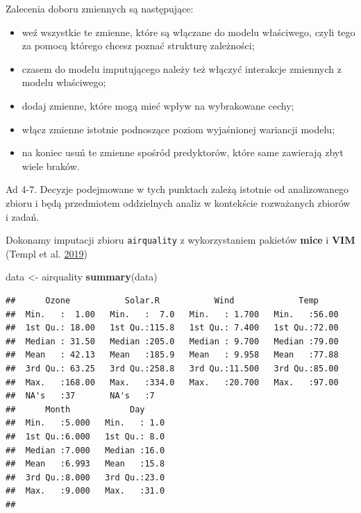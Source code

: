 \documentclass[
]{book}
\newenvironment{Shaded}{\begin{snugshade}}{\end{snugshade}}
\newcommand{\KeywordTok}[1]{\textcolor[rgb]{0.13,0.29,0.53}{\textbf{#1}}}
\newcommand{\NormalTok}[1]{#1}
\newcommand{\StringTok}[1]{\textcolor[rgb]{0.31,0.60,0.02}{#1}}
\providecommand{\tightlist}{%
  \setlength{\itemsep}{0pt}\setlength{\parskip}{0pt}}
\theoremstyle{plain}
\theoremstyle{definition}
\theoremstyle{definition}
\theoremstyle{definition}
\theoremstyle{definition}
\theoremstyle{remark}
\let\BeginKnitrBlock\begin \let\EndKnitrBlock\end
\begin{document}
Zalecenia doboru zmiennych są następujące:

\begin{itemize}
\tightlist
\item
  weź wszystkie te zmienne, które są włączane do modelu właściwego, czyli tego za pomocą którego chcesz poznać strukturę zależności;
\item
  czasem do modelu imputującego należy też włączyć interakcje zmiennych z modelu właściwego;
\item
  dodaj zmienne, które mogą mieć wpływ na wybrakowane cechy;
\item
  włącz zmienne istotnie podnoszące poziom wyjaśnionej wariancji modelu;
\item
  na koniec usuń te zmienne spośród predyktorów, które same zawierają zbyt wiele braków.
\end{itemize}

Ad 4-7. Decyzje podejmowane w tych punktach zależą istotnie od analizowanego zbioru i będą przedmiotem oddzielnych analiz w kontekście rozważanych zbiorów i zadań.

\BeginKnitrBlock{example}
\protect\hypertarget{exm:przyk21}{}{\label{exm:przyk21} }Dokonamy imputacji zbioru \texttt{airquality} z wykorzystaniem pakietów \textbf{mice} i \textbf{VIM} (Templ et al. \protect\hyperlink{ref-R-VIM}{2019})
\EndKnitrBlock{example}

\begin{Shaded}
\begin{Highlighting}[]
\NormalTok{data <-}\StringTok{ }\NormalTok{airquality}
\KeywordTok{summary}\NormalTok{(data)}
\end{Highlighting}
\end{Shaded}

\begin{verbatim}
##      Ozone           Solar.R           Wind             Temp      
##  Min.   :  1.00   Min.   :  7.0   Min.   : 1.700   Min.   :56.00  
##  1st Qu.: 18.00   1st Qu.:115.8   1st Qu.: 7.400   1st Qu.:72.00  
##  Median : 31.50   Median :205.0   Median : 9.700   Median :79.00  
##  Mean   : 42.13   Mean   :185.9   Mean   : 9.958   Mean   :77.88  
##  3rd Qu.: 63.25   3rd Qu.:258.8   3rd Qu.:11.500   3rd Qu.:85.00  
##  Max.   :168.00   Max.   :334.0   Max.   :20.700   Max.   :97.00  
##  NA's   :37       NA's   :7                                       
##      Month            Day      
##  Min.   :5.000   Min.   : 1.0  
##  1st Qu.:6.000   1st Qu.: 8.0  
##  Median :7.000   Median :16.0  
##  Mean   :6.993   Mean   :15.8  
##  3rd Qu.:8.000   3rd Qu.:23.0  
##  Max.   :9.000   Max.   :31.0  
## 
\end{verbatim}
\end{document}
